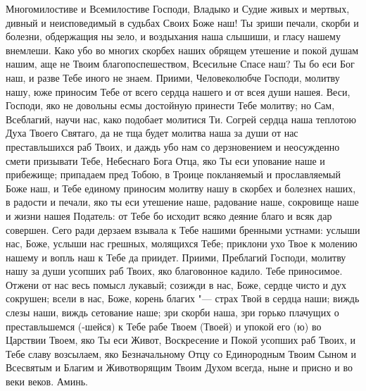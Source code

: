 \begin{mymulticols}


Многомилостиве и Всемилостиве Господи, Владыко и Судие живых и мертвых, дивный и неисповедимый в судьбах Своих Боже наш! Ты зриши печали, скорби и болезни, обдержащия ны зело, и воздыхания наша слышиши, и гласу нашему внемлеши. Како убо во многих скорбех наших обрящем утешение и покой душам нашим, аще не Твоим благопоспешеством, Всесильне Спасе наш? Ты бо еси Бог наш, и разве Тебе иного не знаем. Приими, Человеколюбче Господи, молитву нашу, юже приносим Тебе от всего сердца нашего и от всея души нашея. Веси, Господи, яко не довольны есмы достойную принести Тебе молитву; но Сам, Всеблагий, научи нас, како подобает молитися Ти. Согрей сердца наша теплотою Духа Твоего Святаго, да не тща будет молитва наша за души от нас преставльшихся раб Твоих, и даждь убо нам со дерзновением и неосужденно смети призывати Тебе, Небеснаго Бога Отца, яко Ты еси упование наше и прибежище; припадаем пред Тобою, в Троице покланяемый и прославляемый Боже наш, и Тебе единому приносим молитву нашу в скорбех и болезнех наших, в радости и печали, яко ты еси утешение наше, радование наше, сокровище наше и жизни нашея Податель: от Тебе бо исходит всяко деяние благо и всяк дар совершен. Сего ради дерзаем взывала к Тебе нашими бренными устнами: услыши нас, Боже, услыши нас грешных, молящихся Тебе; приклони ухо Твое к молению нашему и вопль наш к Тебе да приидет. Приими, Преблагий Господи, молитву нашу за души усопших раб Твоих, яко благовонное кадило. Тебе приносимое. Отжени от нас весь помысл лукавый; созижди в нас, Боже, сердце чисто и дух сокрушен; всели в нас, Боже, корень благих "--- страх Твой в сердца наши; виждь слезы наши, виждь сетование наше; зри скорби наша, зри горько плачущих о преставльшемся (-шейся) к Тебе рабе Твоем (Твоей)  и упокой его (ю) во Царствии Твоем, яко Ты еси Живот, Воскресение и Покой усопших раб Твоих, и Тебе славу возсылаем, яко Безначальному Отцу со Единородным Твоим Сыном и Всесвятым и Благим и Животворящим Твоим Духом всегда, ныне и присно и во веки веков. Аминь. 

\end{mymulticols}

\mychapterending

